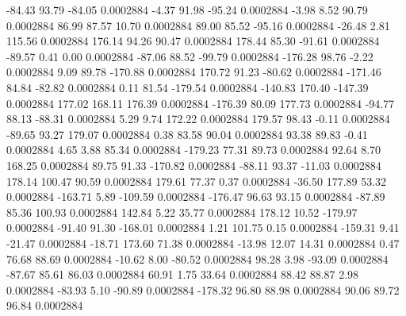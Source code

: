       -84.43       93.79      -84.05     0.0002884
       -4.37       91.98      -95.24     0.0002884
       -3.98        8.52       90.79     0.0002884
       86.99       87.57       10.70     0.0002884
       89.00       85.52      -95.16     0.0002884
      -26.48        2.81      115.56     0.0002884
      176.14       94.26       90.47     0.0002884
      178.44       85.30      -91.61     0.0002884
      -89.57        0.41        0.00     0.0002884
      -87.06       88.52      -99.79     0.0002884
     -176.28       98.76       -2.22     0.0002884
        9.09       89.78     -170.88     0.0002884
      170.72       91.23      -80.62     0.0002884
     -171.46       84.84      -82.82     0.0002884
        0.11       81.54     -179.54     0.0002884
     -140.83      170.40     -147.39     0.0002884
      177.02      168.11      176.39     0.0002884
     -176.39       80.09      177.73     0.0002884
      -94.77       88.13      -88.31     0.0002884
        5.29        9.74      172.22     0.0002884
      179.57       98.43       -0.11     0.0002884
      -89.65       93.27      179.07     0.0002884
        0.38       83.58       90.04     0.0002884
       93.38       89.83       -0.41     0.0002884
        4.65        3.88       85.34     0.0002884
     -179.23       77.31       89.73     0.0002884
       92.64        8.70      168.25     0.0002884
       89.75       91.33     -170.82     0.0002884
      -88.11       93.37      -11.03     0.0002884
      178.14      100.47       90.59     0.0002884
      179.61       77.37        0.37     0.0002884
      -36.50      177.89       53.32     0.0002884
     -163.71        5.89     -109.59     0.0002884
     -176.47       96.63       93.15     0.0002884
      -87.89       85.36      100.93     0.0002884
      142.84        5.22       35.77     0.0002884
      178.12       10.52     -179.97     0.0002884
      -91.40       91.30     -168.01     0.0002884
        1.21      101.75        0.15     0.0002884
     -159.31        9.41      -21.47     0.0002884
      -18.71      173.60       71.38     0.0002884
      -13.98       12.07       14.31     0.0002884
        0.47       76.68       88.69     0.0002884
      -10.62        8.00      -80.52     0.0002884
       98.28        3.98      -93.09     0.0002884
      -87.67       85.61       86.03     0.0002884
       60.91        1.75       33.64     0.0002884
       88.42       88.87        2.98     0.0002884
      -83.93        5.10      -90.89     0.0002884
     -178.32       96.80       88.98     0.0002884
       90.06       89.72       96.84     0.0002884
